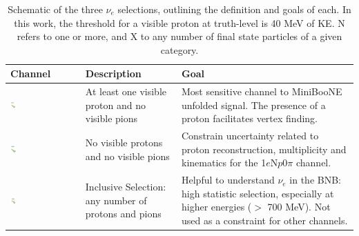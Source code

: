 

\begin{table}[ht]
\caption{\label{tab:selectionsNue} Schematic of the three $\nu_e$ selections, outlining the definition and goals of each. In this work, the threshold for a visible proton at truth-level is 40 MeV of KE. N refers to one or more, and X to any number of final state particles of a given category.}
\centering
\begin{tabular}{ m{} | m{}  m{}  }
Channel & Description & Goal \\
\hline
 \begin{center}\includegraphics[width=0.1\textwidth]{introduction/1eNp}\end{center}& At least one visible proton and no visible pions & Most sensitive channel to MiniBooNE unfolded signal. The presence of a proton facilitates vertex finding.\\
\hline
 \begin{center}\includegraphics[width=0.1\textwidth]{introduction/1e0p}\end{center}& No visible protons and no visible pions & Constrain uncertainty related to proton reconstruction, multiplicity and kinematics for the 1$e$N$p$0$\pi$ channel.\\
\hline
\begin{center}\includegraphics[width=0.1\textwidth]{introduction/inclusive} \end{center} & Inclusive Selection: any number of protons and pions & Helpful to understand $\nu_e$ in the BNB: high statistic selection, especially at higher energies ($>$ 700 MeV). Not used as a constraint for other channels. \\
\hline
\end{tabular}
\label{tab:gt}
\end{table}


